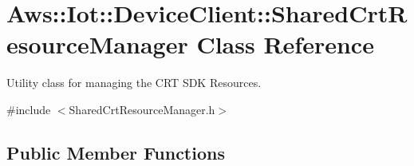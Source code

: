 \hypertarget{class_aws_1_1_iot_1_1_device_client_1_1_shared_crt_resource_manager}{}\section{Aws\+:\+:Iot\+:\+:Device\+Client\+:\+:Shared\+Crt\+Resource\+Manager Class Reference}
\label{class_aws_1_1_iot_1_1_device_client_1_1_shared_crt_resource_manager}


Utility class for managing the C\+RT S\+DK Resources.  




{\ttfamily \#include $<$Shared\+Crt\+Resource\+Manager.\+h$>$}

\subsection*{Public Member Functions}
